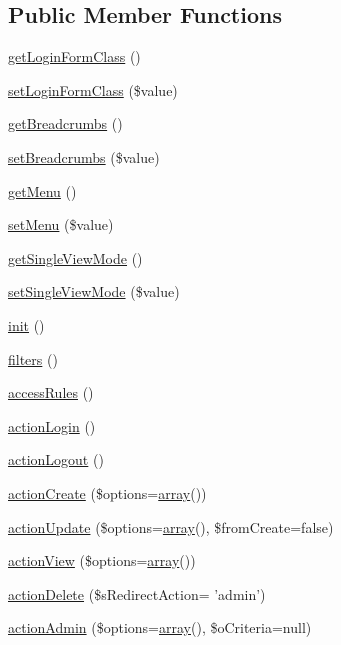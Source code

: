 \subsection*{Public Member Functions}
\begin{DoxyCompactItemize}
\item 
\hyperlink{classCPSCRUDController_a130f7636679c0fba3538a8f6acc2cf38}{getLoginFormClass} ()
\item 
\hyperlink{classCPSCRUDController_a71264b6959d744603416ee56660990be}{setLoginFormClass} (\$value)
\item 
\hyperlink{classCPSCRUDController_ab53bf1b4b27392839a16ecf3ad62e88b}{getBreadcrumbs} ()
\item 
\hyperlink{classCPSCRUDController_a9f9822dfb5d491a6e0b9c836d6ce4e3f}{setBreadcrumbs} (\$value)
\item 
\hyperlink{classCPSCRUDController_a637e84e2e9e99a87ea9b5f1771551af4}{getMenu} ()
\item 
\hyperlink{classCPSCRUDController_a5cf6c2464263681fdc1186bb94ee9ad8}{setMenu} (\$value)
\item 
\hyperlink{classCPSCRUDController_ab04eb4ea0ed0b3efbadf0d150f5d5092}{getSingleViewMode} ()
\item 
\hyperlink{classCPSCRUDController_a72843b131466384083f7434cf7623eeb}{setSingleViewMode} (\$value)
\item 
\hyperlink{classCPSCRUDController_a4be4055f3361d4800e16bc2e2e38cda6}{init} ()
\item 
\hyperlink{classCPSCRUDController_afe5dbb3e026bc3bfdecbd539025c7f93}{filters} ()
\item 
\hyperlink{classCPSCRUDController_a06b9943f26298eca9387c6099343b938}{accessRules} ()
\item 
\hyperlink{classCPSCRUDController_a30a72f87d5741ff2204f385920514239}{actionLogin} ()
\item 
\hyperlink{classCPSCRUDController_ad0002e8029508409bfbbf0cf7d9b3172}{actionLogout} ()
\item 
\hyperlink{classCPSCRUDController_a0e897ab49575e5cf90669511a707e530}{actionCreate} (\$options=\hyperlink{list_8php_aa3205d038c7f8feb5c9f01ac4dfadc88}{array}())
\item 
\hyperlink{classCPSCRUDController_af0a5fa203c2223483f8a9fbca5f25f9b}{actionUpdate} (\$options=\hyperlink{list_8php_aa3205d038c7f8feb5c9f01ac4dfadc88}{array}(), \$fromCreate=false)
\item 
\hyperlink{classCPSCRUDController_a4719f8c8bc82f251a57b2c96066df9cf}{actionView} (\$options=\hyperlink{list_8php_aa3205d038c7f8feb5c9f01ac4dfadc88}{array}())
\item 
\hyperlink{classCPSCRUDController_a1c7da1e1bd646d3dcb9077f2390daba7}{actionDelete} (\$sRedirectAction= 'admin')
\item 
\hyperlink{classCPSCRUDController_a742f460213a7175d366eb851efc50ea3}{actionAdmin} (\$options=\hyperlink{list_8php_aa3205d038c7f8feb5c9f01ac4dfadc88}{array}(), \$oCriteria=null)
\end{DoxyCompactItemize}

